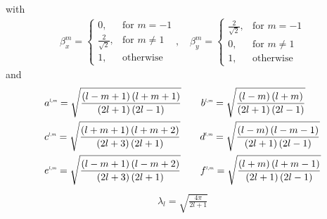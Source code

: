 with
\begin{align*}
\beta_x^{m}=
\left\{
\begin{array}{ll}
0, & \text{for } m = -1\\
\frac{2}{\sqrt{2}}, & \text{for } m \neq 1\\
1, & \text{otherwise }
\end{array}
\right.
,\quad
\beta_y^{m}=
\left\{
\begin{array}{ll}
\frac{2}{\sqrt{2}}, & \text{for } m = -1\\
0, & \text{for } m \neq 1\\
1, & \text{otherwise }
\end{array}
\right.
\end{align*}
and
\begin{align*}
&
a^{\scaleto{l,m}{4pt}}= \sqrt{\frac{\left(l-m+1\right)\left(l+m+1\right)}{\left(2l+1\right)\left(2l-1\right)}} \qquad
b^{\scaleto{l,m}{4pt}}= \sqrt{\frac{\left(l-m\right)\left(l+m\right)}{\left(2l+1\right)\left(2l-1\right)}}
\\&
c^{\scaleto{l,m}{4pt}}= \sqrt{\frac{\left(l+m+1\right)\left(l+m+2\right)}{\left(2l+3\right)\left(2l+1\right)}} \qquad
d^{\scaleto{l,m}{4pt}}= \sqrt{\frac{\left(l-m\right)\left(l-m-1\right)}{\left(2l+1\right)\left(2l-1\right)}}
\\&
e^{\scaleto{l,m}{4pt}}= \sqrt{\frac{\left(l-m+1\right)\left(l-m+2\right)}{\left(2l+3\right)\left(2l+1\right)}} \qquad
f^{\scaleto{l,m}{4pt}}= \sqrt{\frac{\left(l+m\right)\left(l+m-1\right)}{\left(2l+1\right)\left(2l-1\right)}}
\end{align*}
\begin{align*}
\lambda_l=\sqrt{\frac{4\pi}{2l+1}}
\end{align*}









